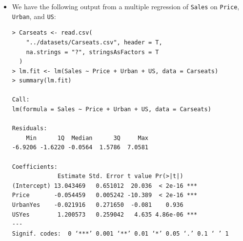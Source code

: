 \begin{itemize}
    \item[(a)] We have the following output from a multiple
        regression of \verb|Sales|
        on \verb|Price|, \verb|Urban|, and \verb|US|:
        \begin{lstlisting}
> Carseats <- read.csv(
    "../datasets/Carseats.csv", header = T,
    na.strings = "?", stringsAsFactors = T
  )
> lm.fit <- lm(Sales ~ Price + Urban + US, data = Carseats)
> summary(lm.fit)

Call:
lm(formula = Sales ~ Price + Urban + US, data = Carseats)

Residuals:
    Min      1Q  Median      3Q     Max
-6.9206 -1.6220 -0.0564  1.5786  7.0581

Coefficients:
             Estimate Std. Error t value Pr(>|t|)
(Intercept) 13.043469   0.651012  20.036  < 2e-16 ***
Price       -0.054459   0.005242 -10.389  < 2e-16 ***
UrbanYes    -0.021916   0.271650  -0.081    0.936
USYes        1.200573   0.259042   4.635 4.86e-06 ***
---
Signif. codes:  0 ‘***’ 0.001 ‘**’ 0.01 ‘*’ 0.05 ‘.’ 0.1 ‘ ’ 1


\end{lstlisting}
\end{itemize}
